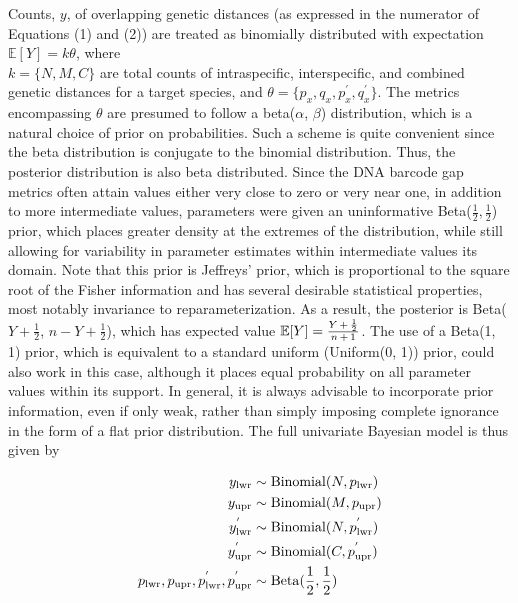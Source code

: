 \documentclass[12pt]{article}
\begin{document}
Counts, $y$, of overlapping genetic distances (as expressed in the numerator of Equations (1) and (2)) are treated as binomially distributed with expectation $\mathbb{E}[Y] = k\theta$, where \\ $k = \{N, M, C\}$ are total counts of intraspecific, interspecific, and combined genetic distances for a target species, and $\theta = \{p_x, q_x, p^{'}_x, q^{'}_x\}$. The metrics encompassing $\theta$ are presumed to follow a beta($\alpha$, $\beta$) distribution, which is a natural choice of prior on probabilities. Such a scheme is quite convenient since the beta distribution is conjugate to the binomial distribution. Thus, the posterior distribution is also beta distributed. Since the DNA barcode gap metrics often attain values either very close to zero or very near one, in addition to more intermediate values, parameters were given an uninformative Beta($\frac{1}{2}, \frac{1}{2}$) prior, which places greater density at the extremes of the distribution, while still allowing for variability in parameter estimates within intermediate values its domain. Note that this prior is Jeffreys' prior, which is proportional to the square root of the Fisher information and has several desirable statistical properties, most notably invariance to reparameterization. As a result, the posterior is Beta($Y + \frac{1}{2}$, $n - Y + \frac{1}{2}$), which has expected value $\mathbb{E}[Y] = \frac{Y \hspace{0.5mm} + \hspace{0.5mm} \frac{1}{2}}{n \hspace{0.5mm} + \hspace{0.5mm} 1}$. The use of a Beta(1, 1) prior, which is equivalent to a standard uniform (Uniform(0, 1)) prior, could also work in this case, although it places equal probability on all parameter values within its support. In general, it is always advisable to incorporate prior information, even if only weak, rather than simply imposing complete ignorance in the form of a flat prior distribution. The full univariate Bayesian model is thus given by

\begin{align}
\notag y_\mathrm{lwr} &\sim \mathrm{Binomial}(N, p_\mathrm{lwr}) \\ 
\notag y_\mathrm{upr} &\sim \mathrm{Binomial}(M, p_\mathrm{upr}) \\ 
y^{'}_\mathrm{lwr} &\sim \mathrm{Binomial}(N, p^{'}_\mathrm{lwr}) \\ 
 \notag y^{'}_\mathrm{upr} &\sim \mathrm{Binomial}(C, p^{'}_\mathrm{upr}) \\ 
\notag p_\mathrm{lwr}, p_\mathrm{upr}, p^{'}_\mathrm{lwr}, p^{'}_\mathrm{upr}
&\sim \mathrm{Beta}(\frac{1}{2}, \frac{1}{2}) 
\end{align}
\end{document}
